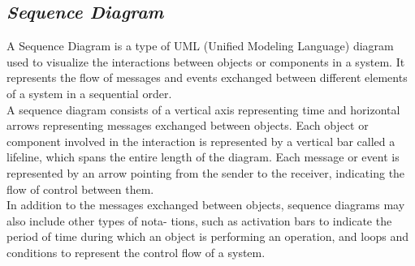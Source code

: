 \documentclass{article}
\begin{document}
\subsection{\textit{Sequence Diagram}}
A Sequence Diagram is a type of UML (Unified Modeling Language) diagram used to visualize the interactions between objects or components in a system. It represents the flow of messages and events exchanged between different elements of a system in a sequential order.\\

A sequence diagram consists of a vertical axis representing time and horizontal arrows representing messages exchanged between objects. Each object or component involved in the interaction is represented by a vertical bar called a lifeline, which spans the entire length of the diagram. Each message or event is represented by an arrow pointing from the sender to the receiver, indicating the flow of control between them.\\

In addition to the messages exchanged between objects, sequence diagrams may also include other types of nota- tions, such as activation bars to indicate the period of time during which an object is performing an operation, and loops and conditions to represent the control flow of a system.\\
\end{document}
